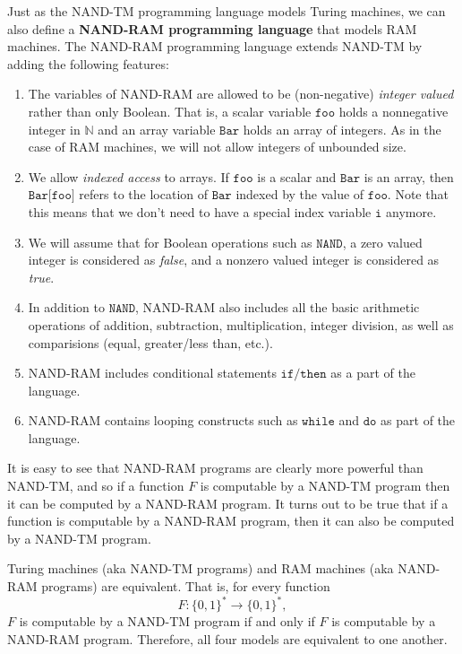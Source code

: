   Just as the NAND-TM programming language models Turing machines, we can also define a \textbf{NAND-RAM programming language} that models RAM machines. The NAND-RAM programming language extends NAND-TM by adding the following features: 
  \begin{enumerate}
      \item The variables of NAND-RAM are allowed to be (non-negative) \textit{integer valued} rather than only Boolean. That is, a scalar variable $\texttt{foo}$ holds a nonnegative integer in $\mathbb{N}$ and an array variable $\texttt{Bar}$ holds an array of integers. As in the case of RAM machines, we will not allow integers of unbounded size. 
      \item We allow \textit{indexed access} to arrays. If $\texttt{foo}$ is a scalar and $\texttt{Bar}$ is an array, then $\texttt{Bar[foo]}$ refers to the location of $\texttt{Bar}$ indexed by the value of $\texttt{foo}$. Note that this means that we don't need to have a special index variable $\texttt{i}$ anymore. 
      \item We will assume that for Boolean operations such as $\texttt{NAND}$, a zero valued integer is considered as \textit{false}, and a nonzero valued integer is considered as \textit{true}. 
      \item In addition to $\texttt{NAND}$, NAND-RAM also includes all the basic arithmetic operations of addition, subtraction, multiplication, integer division, as well as comparisions (equal, greater/less than, etc.). 
      \item NAND-RAM includes conditional statements $\texttt{if/then}$ as a part of the language. 
      \item NAND-RAM contains looping constructs such as $\texttt{while}$ and $\texttt{do}$ as part of the language. 
  \end{enumerate}

  It is easy to see that NAND-RAM programs are clearly more powerful than NAND-TM, and so if a function $F$ is computable by a NAND-TM program then it can be computed by a NAND-RAM program. It turns out to be true that if a function is computable by a NAND-RAM program, then it can also be computed by a NAND-TM program. 

  \begin{theorem}
  Turing machines (aka NAND-TM programs) and RAM machines (aka NAND-RAM programs) are equivalent. That is, for every function 
  \[F: \{0,1\}^* \longrightarrow \{0,1\}^* ,\]
  $F$ is computable by a NAND-TM program if and only if $F$ is computable by a NAND-RAM program. Therefore, all four models are equivalent to one another. 
  \end{theorem}

